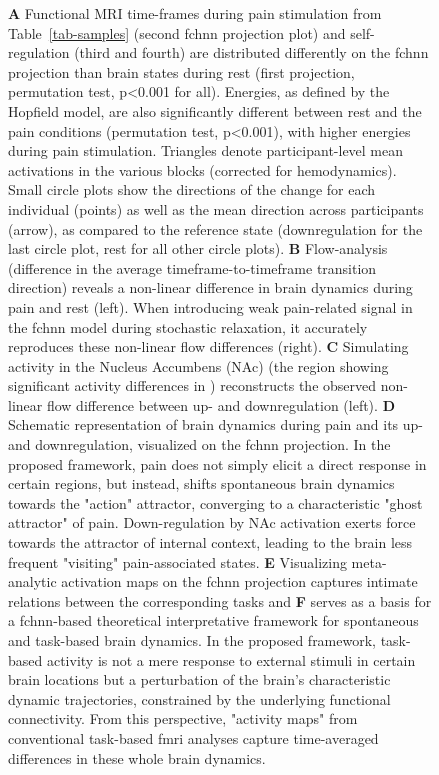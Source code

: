 \documentclass{article}
\begin{document}
\begin{figure}[!htbp]
{\textbf{A} Functional MRI time-frames during pain stimulation from Table~\ref{tab-samples} (second \acrshort{fchnn} projection plot)
and self-regulation (third and fourth) are distributed differently on the \acrshort{fchnn} projection than brain states
during rest (first projection, permutation test, p\textless 0.001 for all). Energies, as defined by the Hopfield model, are also
significantly different between rest and the pain conditions (permutation test, p\textless 0.001), with higher energies during
pain stimulation. Triangles denote participant-level mean activations in the various blocks (corrected for
hemodynamics). Small circle plots show the directions of the change for each individual (points) as well as the mean direction
across participants (arrow), as compared to the reference state (downregulation for the last circle plot, rest for all
other circle plots).
\textbf{B} Flow-analysis (difference in the average timeframe-to-timeframe transition direction) reveals a non-linear difference in brain dynamics during pain and rest (left). When introducing weak pain-related signal in the \acrshort{fchnn} model during stochastic relaxation, it accurately reproduces these non-linear flow differences (right).
\textbf{C} Simulating activity in the Nucleus Accumbens (NAc) (the region showing significant activity differences in \cite{woo2015distinct}) reconstructs the observed non-linear flow difference between up- and downregulation (left).
\textbf{D} Schematic representation of brain dynamics during pain and its up- and downregulation, visualized on the \acrshort{fchnn}  projection. In the proposed framework, pain does not simply elicit a direct response in certain regions, but instead, shifts spontaneous brain dynamics towards the "action" attractor, converging to a characteristic "ghost attractor" of pain. Down-regulation by NAc activation exerts force towards the attractor of internal context, leading to the brain less frequent "visiting" pain-associated states.
\textbf{E} Visualizing meta-analytic activation maps on the \acrshort{fchnn} projection captures intimate relations between the corresponding tasks and \textbf{F} serves as a basis for a \acrshort{fchnn}-based theoretical interpretative framework for spontaneous and task-based brain dynamics. In the proposed framework, task-based activity is not a mere response to external stimuli in certain brain locations but a perturbation of the brain's characteristic dynamic trajectories, constrained by the underlying functional connectivity. From this perspective, "activity maps" from conventional task-based \acrshort{fmri} analyses capture time-averaged differences in these whole brain dynamics.}
\label{task-validity}
\end{figure}
\end{document}
